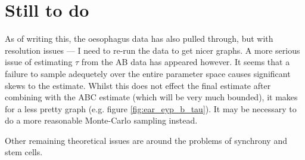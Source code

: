 \documentclass[10pt,english]{article}
\begin{document}
\section{Still to do}

As of writing this, the oesophagus data has also pulled through, but with resolution issues --- I need to re-run the data to get nicer graphs. A more serious issue of estimating $\tau$ from the AB data has appeared however. It seems that a failure to sample adequetely over the entire parameter space causes significant skews to the estimate. Whilst this does not effect the final estimate  after combining with the ABC estimate (which will be very much bounded), it makes for a less pretty graph (e.g. figure \ref{fig:ear_eyp_b_tau}). It may be necessary to do a more reasonable Monte-Carlo sampling instead.

Other remaining theoretical issues are around the problems of synchrony and stem cells.
\end{document}
